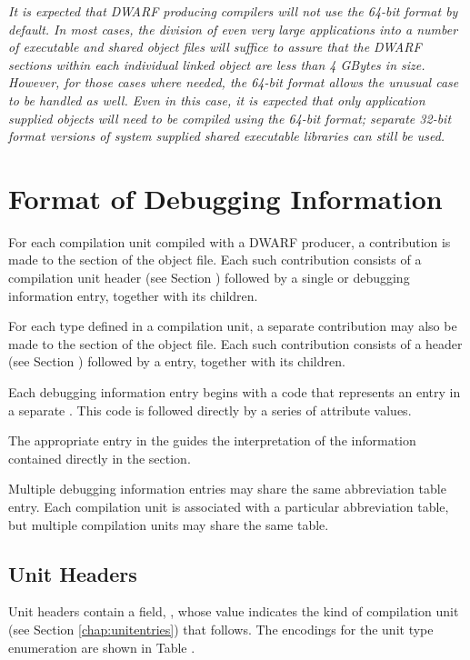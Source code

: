 \textit{It is expected that DWARF producing compilers will \emph{not} use
the 64-bit format \emph{by default}. In most cases, the division of
even very large applications into a number of executable and
shared object files will suffice to assure that the DWARF sections
within each individual linked object are less than 4 GBytes
in size. However, for those cases where needed, the 64-bit
format allows the unusual case to be handled as well. Even
in this case, it is expected that only application supplied
objects will need to be compiled using the 64-bit format;
separate 32-bit format versions of system supplied shared
executable libraries can still be used.}


\section{Format of Debugging Information}
\label{datarep:formatofdebugginginformation}

For each compilation unit compiled with a DWARF producer,
a contribution is made to the \dotdebuginfo{} section of
the object file. Each such contribution consists of a
compilation unit header 
(see Section ) 
followed by a
single \DWTAGcompileunit{} or 
\DWTAGpartialunit{} debugging
information entry, together with its children.

For each type defined in a compilation unit, a separate
contribution may also be made to the 
\dotdebuginfo{} 
section of the object file. Each
such contribution consists of a 
 header 
(see Section ) 
followed by a \DWTAGtypeunit{} entry, together with
its children.

Each debugging information entry begins with a code that
represents an entry in a separate 
. This
code is followed directly by a series of attribute values.

The appropriate entry in the 
 guides the
interpretation of the information contained directly in the
\dotdebuginfo{} section.

Multiple debugging information entries may share the same
abbreviation table entry. Each compilation unit is associated
with a particular abbreviation table, but multiple compilation
units may share the same table.

\subsection{Unit Headers}
\label{datarep:unitheaders}
Unit headers contain a field, , whose value indicates the kind of
compilation unit (see Section \ref{chap:unitentries})
that follows. The encodings for the unit type 
enumeration are shown in Table .

